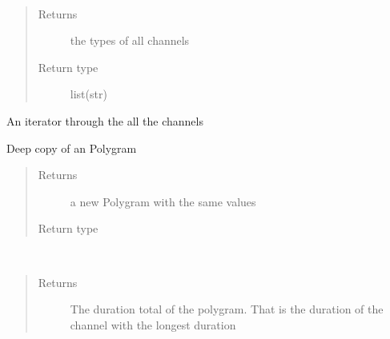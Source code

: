 \documentclass[letterpaper,10pt,english]{sphinxmanual}
\begin{document}
\begin{fulllineitems}
\begin{fulllineitems}
\label{pyrem.polygram:pyrem.polygram.Polygram.channel_types}~\begin{quote}\begin{description}
\item[{Returns}] \leavevmode
the types of all channels

\item[{Return type}] \leavevmode
list(str)

\end{description}\end{quote}

\end{fulllineitems}


\begin{fulllineitems}
\label{pyrem.polygram:pyrem.polygram.Polygram.channels}
An iterator through the all the channels

\end{fulllineitems}


\begin{fulllineitems}
\label{pyrem.polygram:pyrem.polygram.Polygram.copy}
Deep copy of an Polygram
\begin{quote}\begin{description}
\item[{Returns}] \leavevmode
a new Polygram with the same values

\item[{Return type}] \leavevmode
{\hyperref[pyrem.polygram:pyrem.polygram.Polygram]{}}

\end{description}\end{quote}

\end{fulllineitems}


\begin{fulllineitems}
\label{pyrem.polygram:pyrem.polygram.Polygram.duration}~\begin{quote}\begin{description}
\item[{Returns}] \leavevmode
The duration total of the polygram. That is the duration of the channel with the longest duration


\end{description}
\end{quote}
\end{fulllineitems}
\end{fulllineitems}
\end{document}
